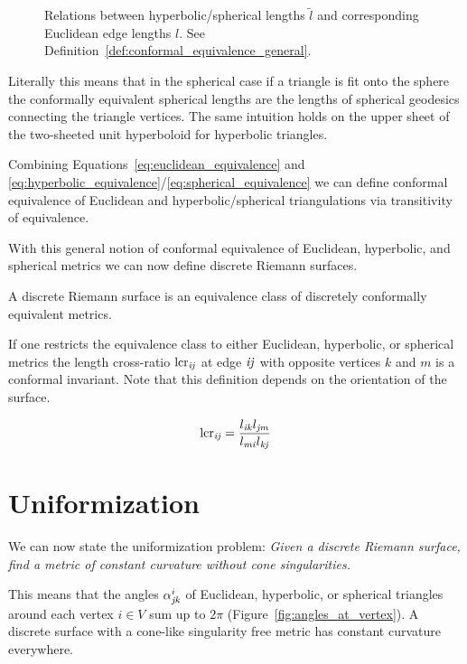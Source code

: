 \begin{figure}
\centering
\scalebox{0.5}{}
\caption[Conformal equivalence of Euclidean and hyperbolic/spherical metrics]{Relations between hyperbolic/spherical lengths $\tilde l$ and corresponding Euclidean edge lengths $l$. See Definition~\ref{def:conformal_equivalence_general}.}
\label{fig:conformal_equivalence_sph_hyp}
\end{figure}

Literally this means that in the spherical case if a triangle is fit onto the sphere the conformally equivalent spherical lengths are the lengths of spherical geodesics connecting the triangle vertices. 
The same intuition holds on the upper sheet of the two-sheeted unit hyperboloid for hyperbolic triangles.

Combining Equations~\ref{eq:euclidean_equivalence} and \ref{eq:hyperbolic_equivalence}/\ref{eq:spherical_equivalence} we can define conformal equivalence of Euclidean and hyperbolic/spherical triangulations via transitivity of equivalence.

With this general notion of conformal equivalence of Euclidean, hyperbolic, and spherical metrics we can now define discrete Riemann surfaces.

\begin{definition}
\label{def:discrete_riemann_surface}
A discrete Riemann surface is an equivalence class of discretely conformally equivalent metrics.
\end{definition}

If one restricts the equivalence class to either Euclidean, hyperbolic, or spherical metrics the length cross-ratio $\mathrm{lcr}_{\it{ij}}$ at edge $\it{ij}$ with opposite vertices $k$ and $m$ is a conformal invariant. Note that this definition depends on the orientation of the surface.

\begin{equation}
	\mathrm{lcr}_{\it{ij}} = \frac{l_{\it{ik}} l_{\it{jm}}} {l_{\it{mi}} l_{\it{kj}}} \label{eq:length_cross_ratio}
\end{equation}

\section{Uniformization}
We can now state the uniformization problem:
\emph{Given a discrete Riemann surface, find a metric of constant curvature
without cone singularities.}

This means that the angles $\alpha_{\it{jk}}^i$ of Euclidean, hyperbolic, or spherical triangles around each vertex  $i\in V$ sum up to $2\pi$ (Figure~\ref{fig:angles_at_vertex}). A discrete surface with a cone-like singularity free metric has constant curvature everywhere. 

